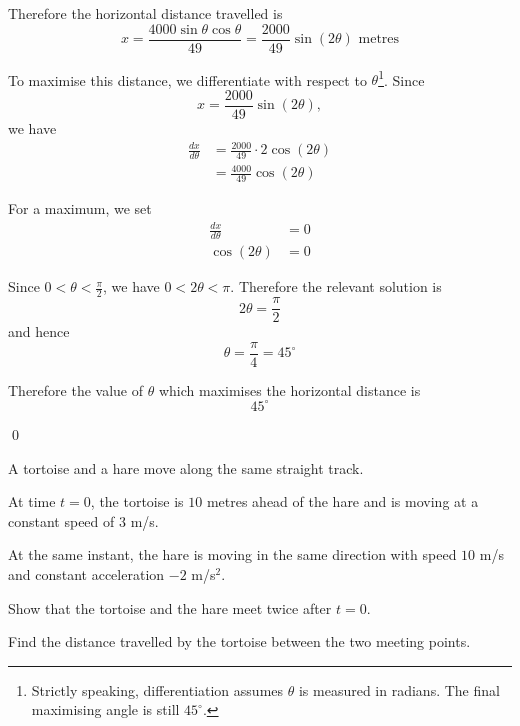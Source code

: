 \begin{solution}
Therefore the horizontal distance travelled is
\[
{x = \frac{4000\sin\theta\cos\theta}{49} = \frac{2000}{49}\sin(2\theta)\text{ metres}}
\]

To maximise this distance, we differentiate with respect to $\theta$\footnote{Strictly speaking, differentiation assumes $\theta$ is measured in radians. The final maximising angle is still $45^\circ$.}. Since
\[
x = \frac{2000}{49}\sin(2\theta),
\]
we have
\begin{align*}
    \frac{dx}{d\theta} &= \frac{2000}{49}\cdot 2\cos(2\theta) \\
                       &= \frac{4000}{49}\cos(2\theta)
\end{align*}

For a maximum, we set
\begin{align*}
    \frac{dx}{d\theta} &= 0 \\
    \cos(2\theta) &= 0
\end{align*}

Since $0 < \theta < \frac{\pi}{2}$, we have $0 < 2\theta < \pi$. Therefore the relevant solution is
\[
2\theta = \frac{\pi}{2}
\]
and hence
\[
\theta = \frac{\pi}{4} = 45^\circ
\]

Therefore the value of $\theta$ which maximises the horizontal distance is
\[
{45^\circ}
\]

\qed
\end{solution}

\begin{example}
A tortoise and a hare move along the same straight track.

At time $t=0$, the tortoise is $10$ metres ahead of the hare and is moving at a constant speed of $3$ m/s.

At the same instant, the hare is moving in the same direction with speed $10$ m/s and constant acceleration $-2$ m/s$^2$.

Show that the tortoise and the hare meet twice after $t=0$.

Find the distance travelled by the tortoise between the two meeting points.

\end{example}

